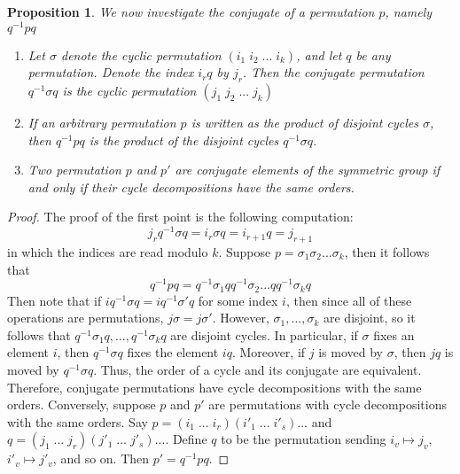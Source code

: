 \documentclass[12pt]{article}
\newtheorem{prop}[thm]{Proposition}
\theoremstyle{definition}
\theoremstyle{remark}
\numberwithin{equation}{section}
\begin{document}
\begin{prop}
        We now investigate the conjugate of a permutation $p$, namely $q^{-1}pq$\begin{enumerate}
                \item Let $\sigma$ denote the cyclic permutation $(i_1\;i_2\;...\;i_k)$, and let $q$ be any permutation. Denote the index $i_rq$ by $j_r$. Then the conjugate permutation $q^{-1}\sigma q$ is the cyclic permutation $(j_1\;j_2\;...\;j_k)$
                \item If an arbitrary permutation $p$ is written as the product of disjoint cycles $\sigma$, then $q^{-1}pq$ is the product of the disjoint cycles $q^{-1}\sigma q$.
                \item Two permutation $p$ and $p'$ are conjugate elements of the symmetric group if and only if their cycle decompositions have the same orders.
        \end{enumerate}
\end{prop}
\begin{proof}
        The proof of the first point is the following computation: \begin{equation}
                j_rq^{-1}\sigma q = i_r\sigma q = i_{r+1}q = j_{r+1}
        \end{equation}
        in which the indices are read modulo $k$. Suppose $p = \sigma_1\sigma_2...\sigma_k$, then it follows that \begin{equation}
                q^{-1}pq = q^{-1}\sigma_1qq^{-1}\sigma_2...qq^{-1}\sigma_kq
        \end{equation}
        Then note that if $iq^{-1}\sigma q = iq^{-1}\sigma' q$ for some index $i$, then since all of these operations are permutations, $j\sigma = j\sigma'$. However, $\sigma_1,...,\sigma_k$ are disjoint, so it follows that $q^{-1}\sigma_1q,...,q^{-1}\sigma_kq$ are disjoint cycles. In particular, if $\sigma$ fixes an element $i$, then $q^{-1}\sigma q$ fixes the element $iq$. Moreover, if $j$ is moved by $\sigma$, then $jq$ is moved by $q^{-1}\sigma q$. Thus, the order of a cycle and its conjugate are equivalent. Therefore, conjugate permutations have cycle decompositions with the same orders. Conversely, suppose $p$ and $p'$ are permutations with cycle decompositions with the same orders. Say $p = (i_1\;...\;i_r)(i'_1\;...\;i'_s)...$ and $q = (j_1\;...\;j_r)(j'_1\;...\;j'_s)...$. Define $q$ to be the permutation sending $i_v\mapsto j_v$, $i'_v \mapsto j'_v$, and so on. Then $p' = q^{-1}pq$.
\end{proof}
\end{document}
